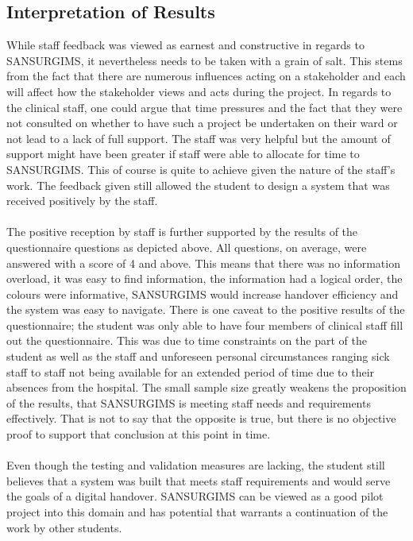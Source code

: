 \subsection{Interpretation of Results}
While staff feedback was viewed as earnest and constructive in regards to SANSURGIMS, it nevertheless needs to be taken with a grain of salt. This stems from the fact that there are numerous influences acting on a stakeholder and each will affect how the stakeholder views and acts during the project. In regards to the clinical staff, one could argue that time pressures and the fact that they were not consulted on whether to have such a project be undertaken on their ward or not lead to a lack of full support. The staff was very helpful but the amount of support might have been greater if staff were able to allocate for time to SANSURGIMS. This of course is quite to achieve given the nature of the staff's work. The feedback given still allowed the student to design a system that was received positively by the staff.
\\ \\
The positive reception by staff is further supported by the results of the questionnaire questions as depicted above. All questions, on average, were answered with a score of 4 and above. This means that there was no information overload, it was easy to find information, the information had a logical order, the colours were informative, SANSURGIMS would increase handover efficiency and the system was easy to navigate. There is one caveat to the positive results of the questionnaire; the student was only able to have four members of clinical staff fill out the questionnaire. This was due to time constraints on the part of the student as well as the staff and unforeseen personal circumstances ranging sick staff to staff not being available for an extended period of time due to their absences from the hospital. The small sample size greatly weakens the proposition of the results, that SANSURGIMS is meeting staff needs and requirements effectively. That is not to say that the opposite is true, but there is no objective proof to support that conclusion at this point in time. 
\\ \\
Even though the testing and validation measures are lacking, the student still believes that a system was built that meets staff requirements and would serve the goals of a digital handover. SANSURGIMS can be viewed as a good pilot project into this domain and has potential that warrants a continuation of the work by other students.
